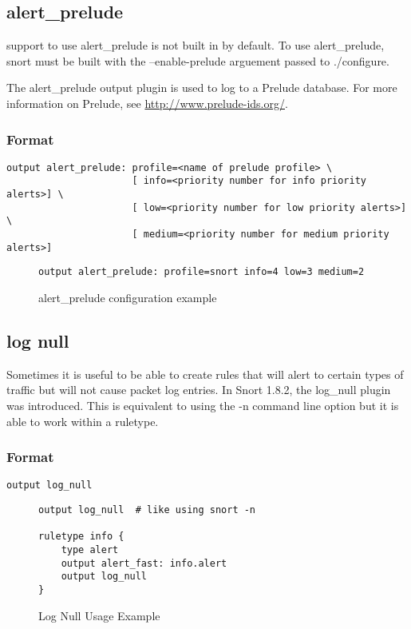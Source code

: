 \documentclass[english]{report}
\newenvironment{note}{
\samepage
    \vspace{10pt}{\textsf{
        {\hspace{7pt}\Huge{$\triangle$\hspace{-12.5pt}{\Large{$^!$}}}}\hspace{5pt}
        {\Large{NOTE}}
    }
    }
   \begin{center}
    \par\vspace{-17pt}

    \begin{lrbox}{\savepar}
    \begin{minipage}[r]{6in}
}
{
    \end{minipage}
    \end{lrbox}
    \fbox{
        \usebox{
            \savepar
	}
    }
    \par\vskip10pt
    \end{center}
}
\begin{document}
\subsection{alert\_prelude}

\begin{note}
support to use alert\_prelude is not built in by default.  To use alert\_prelude, snort must be built with the --enable-prelude arguement passed to ./configure.
\end{note}

The alert\_prelude output plugin is used to log to a Prelude database.  For more information on Prelude, see \url{http://www.prelude-ids.org/}.

\subsubsection{Format}

\begin{verbatim}
output alert_prelude: profile=<name of prelude profile> \
                      [ info=<priority number for info priority alerts>] \
                      [ low=<priority number for low priority alerts>] \
                      [ medium=<priority number for medium priority alerts>]
\end{verbatim}

\begin{figure}[!hbpt]
\begin{verbatim}
output alert_prelude: profile=snort info=4 low=3 medium=2
\end{verbatim}
\caption{alert\_prelude configuration example\label{prelude example}}
\end{figure}

\subsection{log null}

Sometimes it is useful to be able to create rules that will alert
to certain types of traffic but will not cause packet log entries.
In Snort 1.8.2, the log\_null plugin was introduced. This is equivalent
to using the -n command line option but it is able to work within
a ruletype.


\subsubsection{Format}

\begin{verbatim}
output log_null
\end{verbatim}
%
\begin{figure}[!hbpt]
\begin{verbatim}
output log_null  # like using snort -n

ruletype info {
    type alert
    output alert_fast: info.alert
    output log_null
}
\end{verbatim}
\caption{Log Null Usage Example\label{log null usage example}}
\end{figure}
\end{document}
